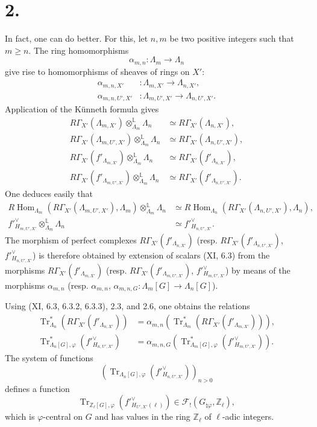 \documentclass[11pt]{article}
\DeclareMathOperator{\Hom}{Hom}
\providecommand{\Tr}{\operatorname{Tr}}
\providecommand{\Tr}{\operatorname{Tr}}
\providecommand{\Tr}{\operatorname{Tr}}
\providecommand{\Hom}{\operatorname{Hom}}
\providecommand{\Tr}{\operatorname{Tr}}
\providecommand{\La}{\Lambda}
\providecommand{\bZ}{\mathbb Z}
\providecommand{\Hom}{\operatorname{Hom}}
\providecommand{\Tr}{\operatorname{Tr}}
\begin{document}
\section*{2.}
In fact, one can do better. For this, let $n,m$ be two positive integers such that $m\ge n$. The ring homomorphisms
\[
\alpha_{m,n}:\La_m\longrightarrow \La_n
\]
give rise to homomorphisms of sheaves of rings on $X'$:
\begin{align*}
\alpha_{m,n,X'}&:\La_{m,X'}\longrightarrow \La_{n,X'},\\
\alpha_{m,n,U',X'}&:\La_{m,U',X'}\longrightarrow \La_{n,U',X'} .
\end{align*}
Application of the Künneth formula gives
\begin{align}
\tag{2.1}R\Gamma_{X'}(\La_{m,X'})\otimes_{\La_m}^{\mathbb L}\La_n&\simeq R\Gamma_{X'}(\La_{n,X'}),\\
\tag{2.2}R\Gamma_{X'}(\La_{m,U',X'})\otimes_{\La_m}^{\mathbb L}\La_n&\simeq R\Gamma_{X'}(\La_{n,U',X'}),\\
\tag{2.3}R\Gamma_{X'}(f'_{\La_{m,X'}})\otimes_{\La_m}^{\mathbb L}\La_n&\simeq R\Gamma_{X'}(f'_{\La_{n,X'}}),\\
\tag{2.4}R\Gamma_{X'}(f'_{\La_{m,U',X'}})\otimes_{\La_m}^{\mathbb L}\La_n&\simeq R\Gamma_{X'}(f'_{\La_{n,U',X'}}).
\end{align}
One deduces easily that
\begin{align}
\tag{2.5}R\Hom_{\La_m}(R\Gamma_{X'}(\La_{m,U',X'}),\La_m)\otimes_{\La_m}^{\mathbb L}\La_n&\simeq R\Hom_{\La_n}(R\Gamma_{X'}(\La_{n,U',X'}),\La_n),\\
\tag{2.6}f'^\vee_{H_{m,U',X'}}\otimes_{\La_m}^{\mathbb L}\La_n&\simeq f'^\vee_{H_{n,U',X'}}.
\end{align}
The morphism of perfect complexes $R\Gamma_{X'}(f'_{\La_{n,X'}})$ (resp. $R\Gamma_{X'}(f'_{\La_{n,U',X'}})$, $f'^\vee_{H_{n,U',X'}}$) is therefore obtained by extension of scalars (XI, 6.3) from the morphisms $R\Gamma_{X'}(f'_{\La_{m,X'}})$ (resp. $R\Gamma_{X'}(f'_{\La_{m,U',X'}})$, $f'^\vee_{H_{m,U',X'}}$) by means of the morphisms $\alpha_{m,n}$ (resp. $\alpha_{m,n}$, $\alpha_{m,n,G}:\La_m[G]\to\La_n[G]$).

Using (XI, 6.3, 6.3.2, 6.3.3), 2.3, and 2.6, one obtains the relations
\begin{align}
\tag{2.7}\Tr^*_{\La_n}(R\Gamma_{X'}(f'_{\La_{n,X'}}))&=\alpha_{m,n}(\Tr^*_{\La_m}(R\Gamma_{X'}(f'_{\La_{m,X'}}))),\\
\tag{2.8}\Tr^*_{\La_n[G],\varphi}(f'^\vee_{H_{n,U',X'}})&=\alpha_{m,n,G}(\Tr^*_{\La_m[G],\varphi}(f'^\vee_{H_{m,U',X'}})).
\end{align}
The system of functions
\[
(\Tr_{\La_n[G],\varphi}(f'^\vee_{H_{n,U',X'}}))_{n>0}
\]
defines a function
\[
\Tr_{\bZ_\ell[G],\varphi}(f'^\vee_{H_{U',X'}(\ell)})
\in \mathcal F_!(G_{\natural\varphi},\bZ_\ell),
\]
which is $\varphi$-central on $G$ and has values in the ring $\bZ_\ell$ of $\ell$-adic integers.
\end{document}

